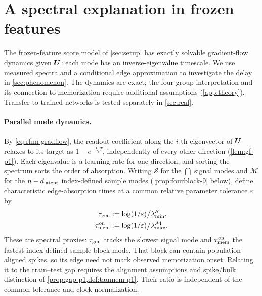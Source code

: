 \section{A spectral explanation in frozen features}
\label{sec:theory}\label{sec:rfnn}

The frozen-feature score model of \cref{sec:setup} has exactly solvable gradient-flow dynamics given $\bm{U}$: each mode has an inverse-eigenvalue timescale. We use measured spectra and a conditional edge approximation to investigate the delay in \cref{sec:phenomenon}. The dynamics are exact; the four-group interpretation and its connection to memorization require additional assumptions (\cref{app:theory}). Transfer to trained networks is tested separately in \cref{sec:real}.

\paragraph{Parallel mode dynamics.}\label{sec:theory-setup}
By \eqref{eq:rfnn-gradflow}, the readout coefficient along the $i$-th eigenvector of $\bm{U}$ relaxes to its target as $1-e^{-\lambda_iT}$, independently of every other direction (\cref{lem:gf-p1}). Each eigenvalue is a learning rate for one direction, and sorting the spectrum sorts the order of absorption. Writing $\mathcal S$ for the $\dint$ signal modes and $\mathcal M$ for the $n-d_{\mathrm{latent}}$ index-defined sample modes (\cref{prop:fourblock-9} below), define characteristic edge-absorption times at a common relative parameter tolerance $\varepsilon$ by
\begin{align}
\tau_{\mathrm{gen}}&:=\log(1/\varepsilon)\big/\lambda^{\mathcal S}_{\min},\label{def:taugen-main}\\
\tau_{\mathrm{mem}}^{\rm on}&:=\log(1/\varepsilon)\big/\lambda^{\mathcal M}_{\max}.\label{def:taumem-main}
\end{align}
These are spectral proxies: $\tau_{\mathrm{gen}}$ tracks the slowest signal mode and $\tau_{\mathrm{mem}}^{\rm on}$ the fastest index-defined sample-block mode. That block can contain population-aligned spikes, so its edge need not mark observed memorization onset. Relating it to the train--test gap requires the alignment assumptions and spike/bulk distinction of \cref{prop:gap-p1,def:taumem-p1}. Their ratio is independent of the common tolerance and clock normalization.

